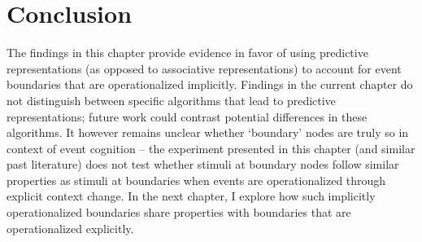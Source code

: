\section{Conclusion}
The findings in this chapter provide evidence in favor of using predictive representations (as opposed to associative representations) to account for event boundaries that are operationalized implicitly. Findings in the current chapter do not distinguish between specific algorithms that lead to predictive representations; future work could contrast potential differences in these algorithms. It however remains unclear whether `boundary' nodes are truly so in context of event cognition -- the experiment presented in this chapter (and similar past literature) does not test whether stimuli at boundary nodes follow similar properties as stimuli at boundaries when events are operationalized through explicit context change. In the next chapter, I explore how such implicitly operationalized boundaries share properties with boundaries that are operationalized explicitly. 